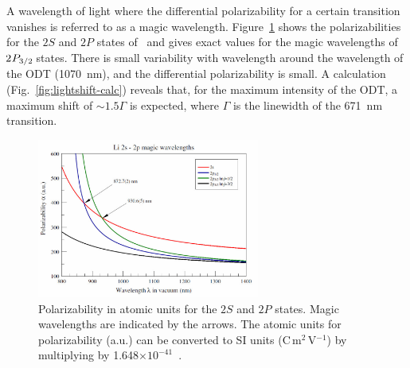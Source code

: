 A wavelength of light where the differential polarizability for a certain
transition vanishes is referred to as a magic wavelength.
Figure~\ref{fig:safronova2p} shows the polarizabilities for the $2S$ and $2P$
states of \li\,  and gives exact values for the magic wavelengths of
$\twop{3/2}$ states.  There is small variability with wavelength around the
wavelength of the ODT (1070~nm),  and the differential polarizability is small.
A calculation (Fig.~\ref{fig:lightshift-calc}) reveals that, for the maximum
intensity of the ODT, a maximum shift of $\sim 1.5\Gamma$ is expected, where
$\Gamma$ is the linewidth of the 671~nm transition. 
\begin{figure}
\centering
\includegraphics[width=0.65\textwidth]{../masters-figures/safronova/2s2p.pdf}
\caption[Polarizabilities for 1070 nm light]{\small Polarizability in atomic
units for the $2S$ and $2P$ states. Magic wavelengths are indicated by the
arrows.   The atomic units for polarizability (a.u.) can be converted to SI
units (C\,m$^{2}$\,V$^{-1}$) by multiplying by
1.648$\times10^{-41}$~\cite{Safronova2006,Safronova2010}.}
\label{fig:safronova2p} 
\end{figure} 

